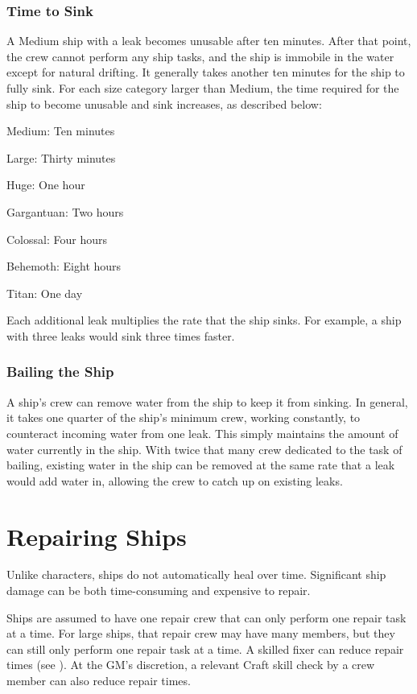     \subsubsection{Time to Sink}
      A Medium ship with a leak becomes unusable after ten minutes.
      After that point, the crew cannot perform any ship tasks, and the ship is immobile in the water except for natural drifting.
      It generally takes another ten minutes for the ship to fully sink.
      For each size category larger than Medium, the time required for the ship to become unusable and sink increases, as described below:
      \begin{raggeditemize}
        \item Medium: Ten minutes
        \item Large: Thirty minutes
        \item Huge: One hour
        \item Gargantuan: Two hours
        \item Colossal: Four hours
        \item Behemoth: Eight hours
        \item Titan: One day
      \end{raggeditemize}

      Each additional leak multiplies the rate that the ship sinks.
      For example, a ship with three leaks would sink three times faster.

    \subsubsection{Bailing the Ship}
      A ship's crew can remove water from the ship to keep it from sinking.
      In general, it takes one quarter of the ship's minimum crew, working constantly, to counteract incoming water from one leak.
      This simply maintains the amount of water currently in the ship.
      With twice that many crew dedicated to the task of bailing, existing water in the ship can be removed at the same rate that a leak would add water in, allowing the crew to catch up on existing leaks.

\section{Repairing Ships}
  Unlike characters, ships do not automatically heal over time.
  Significant ship damage can be both time-consuming and expensive to repair.

  Ships are assumed to have one repair crew that can only perform one repair task at a time.
  For large ships, that repair crew may have many members, but they can still only perform one repair task at a time.
  A skilled fixer can reduce repair times (see ).
  At the GM's discretion, a relevant Craft skill check by a crew member can also reduce repair times.

